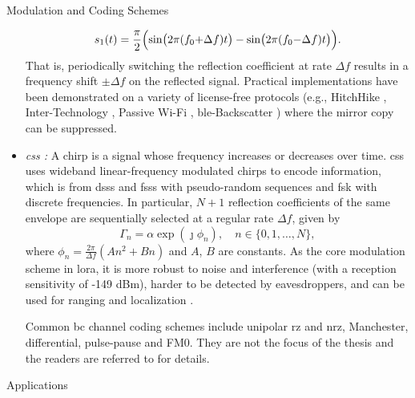 \begin{section}{}
\begin{subsection}{Modulation and Coding Schemes}
\begin{itemize}
			\begin{equation}
				s_1(t) = \frac{\pi}{2} \Bigl(\sin\bigl(2 \pi (f_0 {+} \Delta f) t\bigr) - \sin\bigl(2 \pi (f_0 {-} \Delta f) t\bigr)\Bigr).
			\end{equation}
			That is, periodically switching the reflection coefficient at rate $\Delta f$ results in a frequency shift $\pm \Delta f$ on the reflected signal.
			Practical implementations have been demonstrated on a variety of license-free protocols (e.g., HitchHike \cite{Zhang2016a}, Inter-Technology \cite{Iyer2016}, Passive Wi-Fi \cite{Kellogg2017}, \gls{ble}-Backscatter \cite{Ensworth2017}) where the mirror copy can be suppressed.
			\item \emph{\gls{css} \cite{Talla2017}:} A chirp is a signal whose frequency increases or decreases over time.
			\gls{css} uses wideband linear-frequency modulated chirps to encode information, which is from \gls{dsss} and \gls{fsss} with pseudo-random sequences and \gls{fsk} with discrete frequencies.
			In particular, $N+1$ reflection coefficients of the same envelope are sequentially selected at a regular rate $\Delta f$, given by
			\begin{equation}
				\Gamma_n = \alpha \exp(\jmath \phi_n), \quad n \in \{0, 1, \ldots, N\},
			\end{equation}
			where $\phi_n = \frac{2 \pi}{\Delta f}(A n^2 + B n)$ and $A$, $B$ are constants.
			As the core modulation scheme in \gls{lora}, it is more robust to noise and interference (with a reception sensitivity of -149 dBm), harder to be detected by eavesdroppers, and can be used for ranging and localization \cite{Abbasi2021a}.

			Common \gls{bc} channel coding schemes include unipolar \gls{rz} and \gls{nrz}, Manchester, differential, pulse-pause and FM0.
			They are not the focus of the thesis and the readers are referred to \cite[Chapter 2.3]{Hoang2020} for details.
		\end{itemize}
	\end{subsection}

	\begin{subsection}{Applications}
		\begin{subsubsection}{}

		\end{subsubsection}


\end{subsection}
\end{section}
